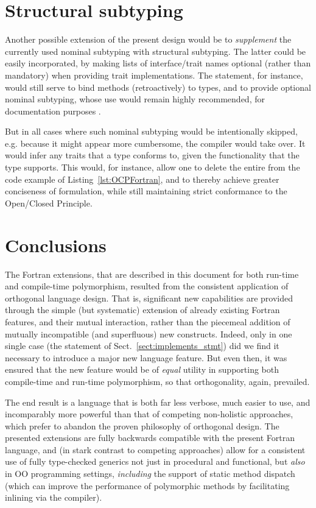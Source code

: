 \documentclass[11pt,oneside]{report}
\newcommand{\code}[1]{{\selectfont\ttfamily{#1}}}
\begin{document}
\section{Structural subtyping}
\label{sect:structural_subtyping}

Another possible extension of the present design would be to
\emph{supplement} the currently used nominal subtyping with
structural subtyping. The latter could be easily incorporated, by
making lists of interface/trait names optional (rather than mandatory)
when providing trait implementations. The \code{implements} statement,
for instance, would still serve to bind methods (retroactively) to
types, and to provide optional nominal subtyping, whose use would
remain highly recommended, for documentation purposes \cite{MojoRef}.

But in all cases where such nominal subtyping would be intentionally
skipped, e.g. because it might appear more cumbersome, the compiler
would take over. It would infer any traits that a type conforms to,
given the functionality that the type supports. This would, for
instance, allow one to delete the entire \code{module intrinsics} from
the code example of Listing~\ref{lst:OCPFortran}, and to thereby
achieve greater conciseness of formulation, while still maintaining
strict conformance to the Open/Closed Principle.


\section{Conclusions}

The Fortran extensions, that are described in this document for both
run-time and compile-time polymorphism, resulted from the consistent
application of orthogonal language design. That is, significant new
capabilities are provided through the simple (but systematic)
extension of already existing Fortran features, and their mutual
interaction, rather than the piecemeal addition of mutually
incompatible (and superfluous) new constructs. Indeed, only in one
single case (the \code{implements} statement of
Sect.~\ref{sect:implements_stmt}) did we find it necessary to
introduce a major new language feature. But even then, it was ensured
that the new feature would be of \emph{equal} utility in supporting
both compile-time and run-time polymorphism, so that orthogonality,
again, prevailed.

The end result is a language that is both far less verbose, much
easier to use, and incomparably more powerful than that of competing
non-holistic approaches, which prefer to abandon the proven philosophy
of orthogonal design. The presented extensions are fully backwards
compatible with the present Fortran language, and (in stark contrast
to competing approaches) allow for a consistent use of fully
type-checked generics not just in procedural and functional, but
\emph{also} in OO programming settings, \emph{including} the support
of static method dispatch (which can improve the performance of
polymorphic methods by facilitating inlining via the compiler).
\end{document}
